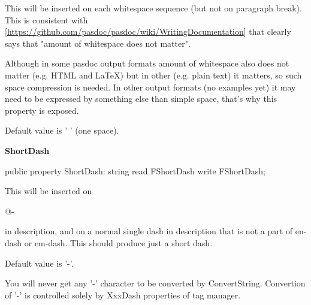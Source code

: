 \documentclass{report}
\newif\ifpdf
\begin{document}
\begin{list}{}
\begin{flushleft}
\ifpdf
\end{flushleft}
\fi


\par This will be inserted on each whitespace sequence (but not on paragraph break). This is consistent with [\href{https://github.com/pasdoc/pasdoc/wiki/WritingDocumentation}{https://github.com/pasdoc/pasdoc/wiki/WritingDocumentation}] that clearly says that "amount of whitespace does not matter".

Although in some pasdoc output formats amount of whitespace also does not matter (e.g. HTML and LaTeX) but in other (e.g. plain text) it matters, so such space compression is needed. In other output formats (no examples yet) it may need to be expressed by something else than simple space, that's why this property is exposed.

Default value is ' ' (one space).\label{PasDoc_TagManager.TTagManager-ShortDash}
\item[\textbf{ShortDash}\hfill]
\ifpdf
\begin{flushleft}
\fi
\begin{ttfamily}
public property ShortDash: string read FShortDash write FShortDash;\end{ttfamily}

\ifpdf
\end{flushleft}
\fi


\par This will be inserted on \begin{ttfamily}@{-}\end{ttfamily} in description, and on a normal single dash in description that is not a part of en{-}dash or em{-}dash. This should produce just a short dash.

Default value is '{-}'.

You will never get any '{-}' character to be converted by ConvertString. Convertion of '{-}' is controlled solely by XxxDash properties of tag manager.


\end{list}
\end{document}
